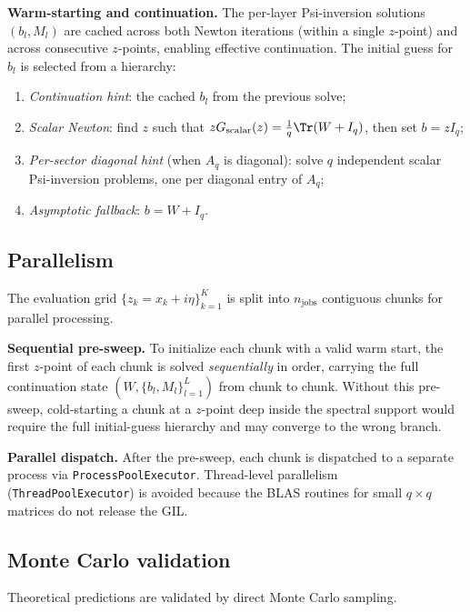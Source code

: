 \medskip
\noindent\textbf{Warm-starting and continuation.}
The per-layer Psi-inversion solutions $(b_l, M_l)$ are cached across both Newton iterations (within a single $z$-point) and across consecutive $z$-points, enabling effective continuation. The initial guess for $b_l$ is selected from a hierarchy:
\begin{enumerate}
\item \emph{Continuation hint}: the cached $b_l$ from the previous solve;
\item \emph{Scalar Newton}: find $z$ such that $z G_{\mathrm{scalar}}(z) = \frac{1}{q}\Tr(W + I_q)$, then set $b = zI_q$;
\item \emph{Per-sector diagonal hint} (when $A_q$ is diagonal): solve $q$ independent scalar Psi-inversion problems, one per diagonal entry of $A_q$;
\item \emph{Asymptotic fallback}: $b = W + I_q$.
\end{enumerate}

\subsection{Parallelism}\label{app:parallelism}

The evaluation grid $\{z_k = x_k + i\eta\}_{k=1}^K$ is split into $n_{\mathrm{jobs}}$ contiguous chunks for parallel processing.

\medskip
\noindent\textbf{Sequential pre-sweep.}
To initialize each chunk with a valid warm start, the first $z$-point of each chunk is solved \emph{sequentially} in order, carrying the full continuation state $(W, \{b_l, M_l\}_{l=1}^L)$ from chunk to chunk. Without this pre-sweep, cold-starting a chunk at a $z$-point deep inside the spectral support would require the full initial-guess hierarchy and may converge to the wrong branch.

\medskip
\noindent\textbf{Parallel dispatch.}
After the pre-sweep, each chunk is dispatched to a separate process via \texttt{ProcessPoolExecutor}. Thread-level parallelism (\texttt{ThreadPoolExecutor}) is avoided because the BLAS routines for small $q \times q$ matrices do not release the GIL.

\subsection{Monte Carlo validation}\label{app:mc-validation}

Theoretical predictions are validated by direct Monte Carlo sampling.

